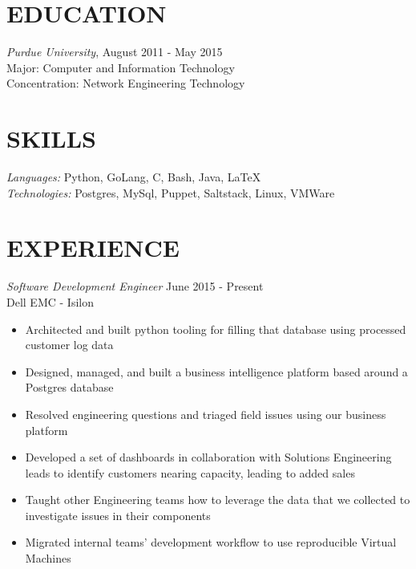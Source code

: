 \documentclass[line,margin]{res}
\begin{document}
  \name{\textcolor{TealBlue}{Ethan Madden}}
  \address{ethan@madden.ninja - (812) 250-1419}
  \address{2049 NW 60th St, Seattle WA 98107}

\begin{resume}
  \section{\textcolor{TealBlue}{EDUCATION}} 
    {\sl Purdue University}, \hfill August 2011 - May 2015 \\
      Major: Computer and Information Technology \\
      Concentration: Network Engineering Technology

  \section{\textcolor{TealBlue}{SKILLS}} 
    {\sl Languages:}  Python, GoLang, C, Bash, Java, \LaTeX \\
    {\sl Technologies:} Postgres, MySql, Puppet, Saltstack, Linux, VMWare

  \section{\textcolor{TealBlue}{EXPERIENCE}} 
    {\sl Software Development Engineer} \hfill June 2015 - Present \\
      Dell EMC - Isilon
      \begin{itemize}  \itemsep -2pt
        \item Architected and built python tooling for filling that database using processed customer log data
        \item Designed, managed, and built a business intelligence platform based around a Postgres database
        \item Resolved engineering questions and triaged field issues using our business platform
        \item Developed a set of dashboards in collaboration with Solutions Engineering leads to identify customers nearing capacity, leading to added sales
        \item Taught other Engineering teams how to leverage the data that we collected to investigate issues in their components
        \item Migrated internal teams' development workflow to use reproducible Virtual Machines
      \end{itemize}


\end{resume}
\end{document}
